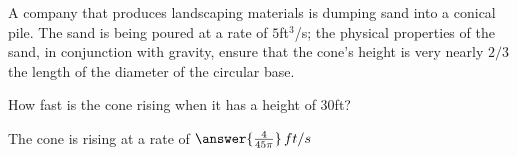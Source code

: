 \documentclass{ximera}
\author{Gregory Hartman \and Matthew Carr}
\begin{document}
\begin{exercise}




A company that produces landscaping materials is dumping sand into a
conical pile. The sand is being poured at a rate of $5$ft$^3$/s; the
physical properties of the sand, in conjunction with gravity, ensure
that the cone's height is very nearly $2/3$ the length of the diameter
of the circular base.

How fast is the cone rising when it has a height of $30$ft?
\begin{prompt}
The cone is rising at a rate of $\answer{\frac{4}{45\pi}}\,ft/s$
\end{prompt}


\end{exercise}
\end{document}
